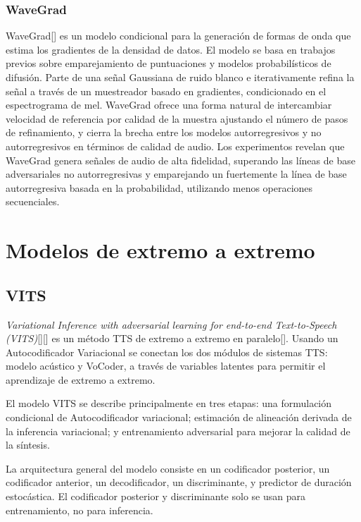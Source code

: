 \subsubsection{WaveGrad}

WaveGrad[\cite{chen2020wavegrad}] es un modelo condicional para la generación de formas de onda que estima los gradientes de la densidad de datos. El modelo se basa en trabajos previos sobre emparejamiento de puntuaciones y modelos probabilísticos de difusión. Parte de una señal Gaussiana de ruido blanco e iterativamente refina la señal a través de un muestreador basado en gradientes, condicionado en el espectrograma de mel. WaveGrad ofrece una forma natural de intercambiar velocidad de referencia por calidad de la muestra ajustando el número de pasos de refinamiento, y cierra la brecha entre los modelos autorregresivos y no autorregresivos en términos de calidad de audio. Los experimentos revelan que WaveGrad genera señales de audio de alta fidelidad, superando las líneas de base adversariales no autorregresivas y emparejando un fuertemente la línea de base autorregresiva basada en la probabilidad, utilizando menos operaciones secuenciales.


\section{Modelos de extremo a extremo} \label{end-to-end}

\subsection{VITS}

\textit{Variational Inference with adversarial learning for end-to-end Text-to-Speech (VITS)}[\cite{kim2021conditional}][\cite{vits}] es un método TTS de extremo a extremo en paralelo[\cite{chen2019learning}]. Usando un Autocodificador Variacional se conectan los dos módulos de sistemas TTS: modelo acústico y VoCoder, a través de variables latentes para permitir el aprendizaje de extremo a extremo. 

El modelo VITS se describe principalmente en tres etapas: una formulación condicional de Autocodificador variacional; estimación de alineación derivada de la inferencia variacional; y entrenamiento adversarial para mejorar la calidad de la síntesis.

La arquitectura general del modelo consiste en un codificador posterior, un codificador anterior, un decodificador, un discriminante, y predictor de duración estocástica. El codificador posterior y discriminante solo se usan para entrenamiento, no para inferencia.

